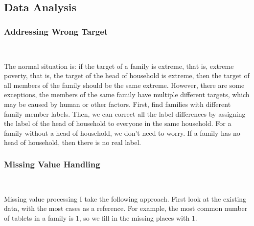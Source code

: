 
\subsection{Data Analysis}

\subsubsection{Addressing Wrong Target}
\

The normal situation is: if the target of a family is extreme, that is, extreme poverty, that is, the target of the head of household is extreme, then the target of all members of the family should be the same extreme. However, there are some exceptions, the members of the same family have multiple different targets, which may be caused by human or other factors.
First, find families with different family member labels. Then, we can correct all the label differences by assigning the label of the head of household to everyone in the same household.
For a family without a head of household, we don't need to worry. If a family has no head of household, then there is no real label.

\subsubsection{Missing Value Handling}
\

Missing value processing I take the following approach. First look at the existing data, with the most cases as a reference. For example, the most common number of tablets in a family is 1, so we fill in the missing places with 1.

